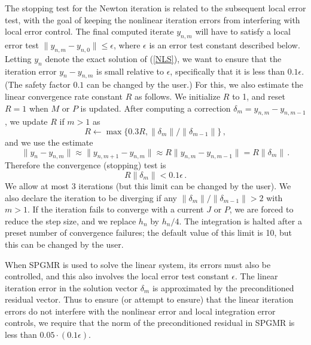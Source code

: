 The stopping test for the Newton iteration is related to the
subsequent local error test, with the goal of keeping the nonlinear
iteration errors from interfering with local error control.  The final
computed iterate $y_{n,m}$ will have to satisfy a local error test
$\|y_{n,m} - y_{n,0}\| \leq \epsilon$, where $\epsilon$ is an error
test constant described below.  Letting $y_n$ denote the exact
solution of (\ref{NLS}), we want to ensure that the iteration error
$y_n-y_{n,m}$ is small relative to $\epsilon$, specifically that it is
less than $0.1 \epsilon$.  (The safety factor $0.1$ can be changed by
the user.)  For this, we also estimate the linear convergence rate
constant $R$ as follows.  We initialize $R$ to 1, and reset $R = 1$
when $M$ or $P$ is updated.  After computing a correction
$\delta_m = y_{n,m} - y_{n,m-1}$, we update $R$ if $m > 1$ as
\begin{equation*}
  R \leftarrow \max\{0.3R , \|\delta_m\| / \|\delta_{m-1}\| \} \, ,
\end{equation*}
and we use the estimate
\begin{equation*}
  \| y_n - y_{n,m} \| \approx \| y_{n,m+1} - y_{n,m} \|
  \approx R \| y_{n,m} - y_{n,m-1} \|  =  R \|\delta_m \| \, .
\end{equation*}
Therefore the convergence (stopping) test is
\begin{equation*}
  R \|\delta_m \| < 0.1 \epsilon \, .
\end{equation*}
We allow at most 3 iterations (but this limit can be changed by the
user).  We also declare the iteration to be diverging if any
$\|\delta_m\|/\|\delta_{m-1}\| > 2$ with $m > 1$. If the iteration
fails to converge with a current $J$ or $P$, we are forced to reduce
the step size, and we replace $h_n$ by $h_n/4$.  The integration is
halted after a preset number of convergence failures; the default
value of this limit is 10, but this can be changed by the user.

When SPGMR is used to solve the linear system, its errors must also be
controlled, and this also involves the local error test constant
$\epsilon$.  The linear iteration error in the solution vector
$\delta_m$ is approximated by the preconditioned residual vector.
Thus to ensure (or attempt to ensure) that the linear iteration errors
do not interfere with the nonlinear error and local integration error
controls, we require that the norm of the preconditioned residual in
SPGMR is less than $0.05 \cdot (0.1 \epsilon)$.

